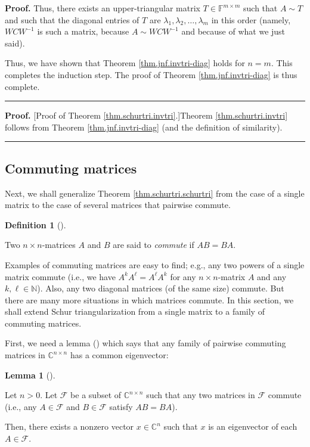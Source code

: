\documentclass[numbers=enddot,12pt,final,onecolumn,notitlepage]{scrartcl}%
\numberwithin{exer}{subsection}
\theoremstyle{definition}
\newtheorem{lem}[theo]{Lemma}
\newenvironment{lemma}[1][]
{\begin{lem}[#1]\begin{leftbar}}
{\end{leftbar}\end{lem}}
\newtheorem{defi}[theo]{Definition}
\newenvironment{definition}[1][]
{\begin{defi}[#1]\begin{leftbar}}
{\end{leftbar}\end{defi}}
\newenvironment{proof}[1][Proof]{\noindent\textbf{#1.} }{\ \rule{0.5em}{0.5em}}
\begin{document}
\begin{proof}
Thus, there exists an upper-triangular matrix $T\in\mathbb{F}^{m\times m}$
such that $A\sim T$ and such that the diagonal entries of $T$ are $\lambda
_{1},\lambda_{2},\ldots,\lambda_{m}$ in this order (namely, $WCW^{-1}$ is such
a matrix, because $A\sim WCW^{-1}$ and because of what we just said).

Thus, we have shown that Theorem \ref{thm.jnf.invtri-diag} holds for $n=m$.
This completes the induction step. The proof of Theorem
\ref{thm.jnf.invtri-diag} is thus complete.
\end{proof}

\begin{proof}
[Proof of Theorem \ref{thm.schurtri.invtri}.]Theorem \ref{thm.schurtri.invtri}
follows from Theorem \ref{thm.jnf.invtri-diag} (and the definition of similarity).
\end{proof}

\subsection{Commuting matrices}

Next, we shall generalize Theorem \ref{thm.schurtri.schurtri} from the case of
a single matrix to the case of several matrices that pairwise commute.

\begin{definition}
Two $n\times n$-matrices $A$ and $B$ are said to \emph{commute} if $AB=BA$.
\end{definition}

Examples of commuting matrices are easy to find; e.g., any two powers of a
single matrix commute (i.e., we have $A^{k}A^{\ell}=A^{\ell}A^{k}$ for any
$n\times n$-matrix $A$ and any $k,\ell\in\mathbb{N}$). Also, any two diagonal
matrices (of the same size) commute. But there are many more situations in
which matrices commute. In this section, we shall extend Schur
triangularization from a single matrix to a family of commuting matrices.

First, we need a lemma (\cite[Lemma 1.3.19]{HorJoh13}) which says that any
family of pairwise commuting matrices in $\mathbb{C}^{n\times n}$ has a common eigenvector:

\begin{lemma}
\label{lem.schurtri.commute.1}Let $n>0$. Let $\mathcal{F}$ be a subset of
$\mathbb{C}^{n\times n}$ such that any two matrices in $\mathcal{F}$ commute
(i.e., any $A\in\mathcal{F}$ and $B\in\mathcal{F}$ satisfy $AB=BA$).

Then, there exists a nonzero vector $x\in\mathbb{C}^{n}$ such that $x$ is an
eigenvector of each $A\in\mathcal{F}$.
\end{lemma}
\end{document}
